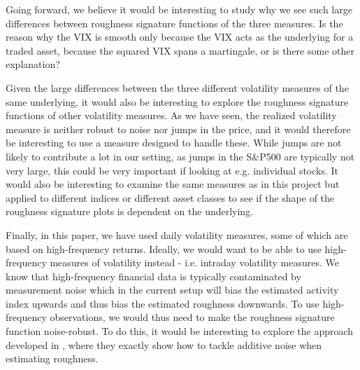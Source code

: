 \documentclass[fleqn,11pt,letterpaper]{article}
\theoremstyle{plain}
\theoremstyle{definition}
\theoremstyle{remark}
\numberwithin{equation}{section}
\begin{document}
Going forward, we believe it would be interesting to study why we see such large differences between roughness signature functions of the three measures. Is the reason why the VIX is smooth only because the VIX acts as the underlying for a traded asset, because the squared VIX spans a martingale, or is there some other explanation? 

Given the large differences between the three different volatility measures of the same underlying, it would also be interesting to explore the roughness signature functions of other volatility measures. As we have seen, the realized volatility measure is neither robust to noise nor jumps in the price, and it would therefore be interesting to use a measure designed to handle these. While jumps are not likely to contribute a lot in our setting, as jumps in the S\&P500 are typically not very large, this could be very important if looking at e.g. individual stocks. It would also be interesting to examine the same measures as in this project but applied to different indices or different asset classes to see if the shape of the roughness signature plots is dependent on the underlying. 

Finally, in this paper, we have used daily volatility measures, some of which are based on high-frequency returns. Ideally, we would want to be able to use high-frequency measures of volatility instead - i.e. intraday volatility measures. We know that high-frequency financial data is typically contaminated by measurement noise which in the current setup will bias the estimated activity index upwards and thus bias the estimated roughness downwards. To use high-frequency observations, we would thus need to make the roughness signature function noise-robust. To do this, it would be interesting to explore the approach developed in \cite{Bennedsen2020}, where they exactly show how to tackle additive noise when estimating roughness. 

\pagebreak

{\small 


}
\end{document}
